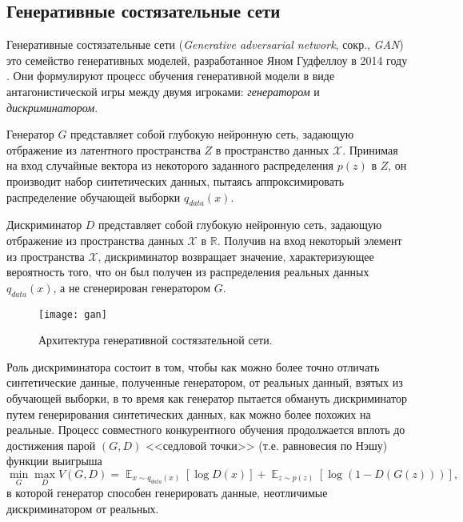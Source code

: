 

\subsection{Генеративные состязательные сети}

Генеративные состязательные сети (\emph{Generative adversarial network}, сокр., \emph{GAN})  это семейство генеративных моделей, разработанное Яном Гудфеллоу в 2014 году \cite{goodfellow2014generative}.  Они формулируют процесс обучения  генеративной модели в виде антагонистической игры между двумя игроками: \emph{генератором} и \emph{дискриминатором}.

Генератор $G$ представляет собой глубокую нейронную сеть, задающую отбражение из латентного пространства $Z$ в пространство данных $\mathcal X$.
Принимая на вход случайные вектора из некоторого заданного распределения $p(z)$ в $Z$, он производит набор синтетических данных, пытаясь аппроксимировать распределение обучающей выборки $q_{data}(x)$.

Дискриминатор $D$ представляет собой глубокую нейронную сеть, задающую отбражение из пространства данных $\mathcal X$ в $\mathbb R$. Получив на вход некоторый элемент из пространства $\mathcal X$, дискриминатор возвращает значение, характеризующее вероятность того, что он был получен из распределения реальных данных $q_{data}(x)$, а не сгенерирован генератором $G$.

\begin{figure}[h]
\begin{center}
    \texttt{[image: gan]}
    \caption{Архитектура генеративной состязательной сети.}
    \label{fig:subim11}
\end{center}
\end{figure}

Роль дискриминатора состоит в том, чтобы как можно более точно отличать синтетические данные, полученные генератором, от реальных данный, взятых из обучающей выборки, в то время как генератор пытается обмануть дискриминатор путем генерирования синтетических данных, как можно более похожих на реальные.
Процесс совместного конкурентного обучения продолжается вплоть до достижения парой $(G, D)$ <<седловой точки>> (т.е. равновесия по Нэшу) \cite{goodfellow2017nips} функции выигрыша
$$
\min_{G} \max_{D} V(G, D) = \mathop{\mathbb{E}}_{x \sim q_{data}(x)} [\log D(x)] + \mathop{\mathbb{E}}_{z \sim p(z)} [\log (1 - D(G(z)))] ,
$$
в которой генератор способен генерировать данные, неотличимые дискриминатором от реальных.

